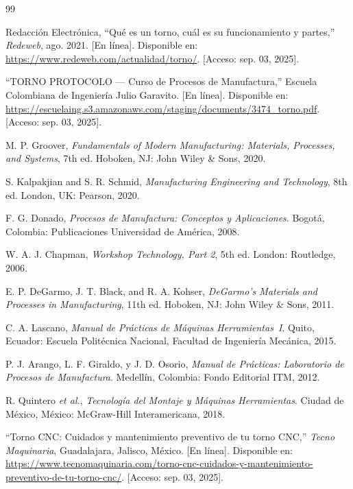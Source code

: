 \documentclass[12pt,a4paper]{article}
\begin{document}
\newpage
{\small
\begin{thebibliography}{99}
\setlength{\itemsep}{3pt plus 1pt minus 1pt}

 Redacción Electrónica, ``Qué es un torno, cuál es su funcionamiento y partes,'' \textit{Redeweb}, ago. 2021. [En línea]. Disponible en: \url{https://www.redeweb.com/actualidad/torno/}. [Acceso: sep. 03, 2025].

 ``TORNO PROTOCOLO --- Curso de Procesos de Manufactura,'' Escuela Colombiana de Ingeniería Julio Garavito. [En línea]. Disponible en: \url{https://escuelaing.s3.amazonaws.com/staging/documents/3474_torno.pdf}. [Acceso: sep. 03, 2025].

 M. P. Groover, \textit{Fundamentals of Modern Manufacturing: Materials, Processes, and Systems}, 7th ed. Hoboken, NJ: John Wiley \& Sons, 2020.

 S. Kalpakjian and S. R. Schmid, \textit{Manufacturing Engineering and Technology}, 8th ed. London, UK: Pearson, 2020.

 F. G. Donado, \textit{Procesos de Manufactura: Conceptos y Aplicaciones}. Bogotá, Colombia: Publicaciones Universidad de América, 2008.

 W. A. J. Chapman, \textit{Workshop Technology, Part 2}, 5th ed. London: Routledge, 2006.

 E. P. DeGarmo, J. T. Black, and R. A. Kohser, \textit{DeGarmo's Materials and Processes in Manufacturing}, 11th ed. Hoboken, NJ: John Wiley \& Sons, 2011.

 C. A. Lascano, \textit{Manual de Prácticas de Máquinas Herramientas~I}. Quito, Ecuador: Escuela Politécnica Nacional, Facultad de Ingeniería Mecánica, 2015.

 P. J. Arango, L. F. Giraldo, y J. D. Osorio, \textit{Manual de Prácticas: Laboratorio de Procesos de Manufactura}. Medellín, Colombia: Fondo Editorial ITM, 2012.

 R. Quintero \textit{et al.}, \textit{Tecnología del Montaje y Máquinas Herramientas}. Ciudad de México, México: McGraw-Hill Interamericana, 2018.

 ``Torno CNC: Cuidados y mantenimiento preventivo de tu torno CNC,'' \textit{Tecno Maquinaria}, Guadalajara, Jalisco, México. [En línea]. Disponible en: \url{https://www.tecnomaquinaria.com/torno-cnc-cuidados-y-mantenimiento-preventivo-de-tu-torno-cnc/}. [Acceso: sep. 03, 2025].


\end{thebibliography}}
\end{document}
